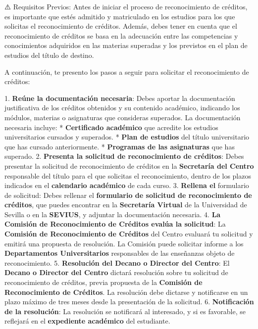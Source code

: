 \documentclass{article}
\begin{document}
\begin{itemize}
\begin{itemize}
                ⚠️ Requisitos Previos:
                Antes de iniciar el proceso de reconocimiento de créditos, es importante que estés admitido y matriculado en los estudios para los que solicitas el reconocimiento de créditos. Además, debes tener en cuenta que el reconocimiento de créditos se basa en la adecuación entre las competencias y conocimientos adquiridos en las materias superadas y los previstos en el plan de estudios del título de destino.

                A continuación, te presento los pasos a seguir para solicitar el reconocimiento de créditos:

                1. \textbf{Reúne la documentación necesaria}: Debes aportar la documentación justificativa de los créditos obtenidos y su contenido académico, indicando los módulos, materias o asignaturas que consideras superados. La documentación necesaria incluye:
                * \textbf{Certificado académico} que acredite los estudios universitarios cursados y superados.
                * \textbf{Plan de estudios} del título universitario que has cursado anteriormente.
                * \textbf{Programas de las asignaturas} que has superado.
                2. \textbf{Presenta la solicitud de reconocimiento de créditos}: Debes presentar la solicitud de reconocimiento de créditos en la \textbf{Secretaría del Centro} responsable del título para el que solicitas el reconocimiento, dentro de los plazos indicados en el \textbf{calendario académico} de cada curso.
                3. \textbf{Rellena el }formulario de solicitud\textbf{}: Debes rellenar el \textbf{formulario de solicitud de reconocimiento de créditos}, que puedes encontrar en la \textbf{Secretaría Virtual} de la Universidad de Sevilla o en la \textbf{SEVIUS}, y adjuntar la documentación necesaria.
                4. \textbf{La Comisión de Reconocimiento de Créditos evalúa la solicitud}: La \textbf{Comisión de Reconocimiento de Créditos} del Centro evaluará tu solicitud y emitirá una propuesta de resolución. La Comisión puede solicitar informe a los \textbf{Departamentos Universitarios} responsables de las enseñanzas objeto de reconocimiento.
                5. \textbf{Resolución del Decano o Director del Centro}: El \textbf{Decano o Director del Centro} dictará resolución sobre tu solicitud de reconocimiento de créditos, previa propuesta de la \textbf{Comisión de Reconocimiento de Créditos}. La resolución debe dictarse y notificarse en un plazo máximo de tres meses desde la presentación de la solicitud.
                6. \textbf{Notificación de la resolución}: La resolución se notificará al interesado, y si es favorable, se reflejará en el \textbf{expediente académico} del estudiante.


\end{itemize}
\end{itemize}
\end{document}
